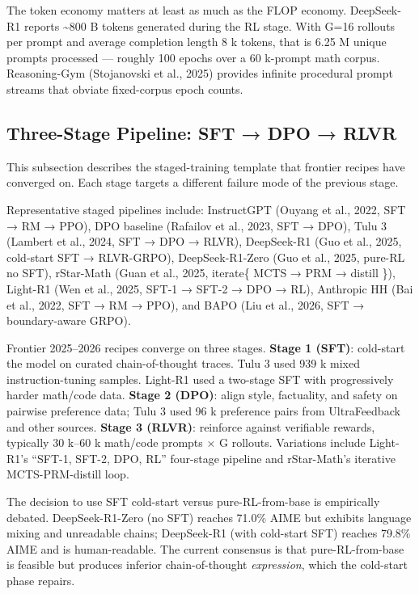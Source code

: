The token economy matters at least as much as the FLOP economy. DeepSeek-R1 reports \textasciitilde800 B tokens generated during the RL stage. With G=16 rollouts per prompt and average completion length 8 k tokens, that is 6.25 M unique prompts processed --- roughly 100 epochs over a 60 k-prompt math corpus. Reasoning-Gym (Stojanovski et al., 2025) provides infinite procedural prompt streams that obviate fixed-corpus epoch counts.

\subsection{Three-Stage Pipeline: SFT → DPO → RLVR}\label{three-stage-pipeline-sft-dpo-rlvr}

This subsection describes the staged-training template that frontier recipes have converged on. Each stage targets a different failure mode of the previous stage.

Representative staged pipelines include: InstructGPT (Ouyang et al., 2022, SFT → RM → PPO), DPO baseline (Rafailov et al., 2023, SFT → DPO), Tulu 3 (Lambert et al., 2024, SFT → DPO → RLVR), DeepSeek-R1 (Guo et al., 2025, cold-start SFT → RLVR-GRPO), DeepSeek-R1-Zero (Guo et al., 2025, pure-RL no SFT), rStar-Math (Guan et al., 2025, iterate\{ MCTS → PRM → distill \}), Light-R1 (Wen et al., 2025, SFT-1 → SFT-2 → DPO → RL), Anthropic HH (Bai et al., 2022, SFT → RM → PPO), and BAPO (Liu et al., 2026, SFT → boundary-aware GRPO).

Frontier 2025--2026 recipes converge on three stages. \textbf{Stage 1 (SFT)}: cold-start the model on curated chain-of-thought traces. Tulu 3 used 939 k mixed instruction-tuning samples. Light-R1 used a two-stage SFT with progressively harder math/code data. \textbf{Stage 2 (DPO)}: align style, factuality, and safety on pairwise preference data; Tulu 3 used 96 k preference pairs from UltraFeedback and other sources. \textbf{Stage 3 (RLVR)}: reinforce against verifiable rewards, typically 30 k--60 k math/code prompts × G rollouts. Variations include Light-R1's ``SFT-1, SFT-2, DPO, RL'' four-stage pipeline and rStar-Math's iterative MCTS-PRM-distill loop.

The decision to use SFT cold-start versus pure-RL-from-base is empirically debated. DeepSeek-R1-Zero (no SFT) reaches 71.0\% AIME but exhibits language mixing and unreadable chains; DeepSeek-R1 (with cold-start SFT) reaches 79.8\% AIME and is human-readable. The current consensus is that pure-RL-from-base is feasible but produces inferior chain-of-thought \emph{expression}, which the cold-start phase repairs.

